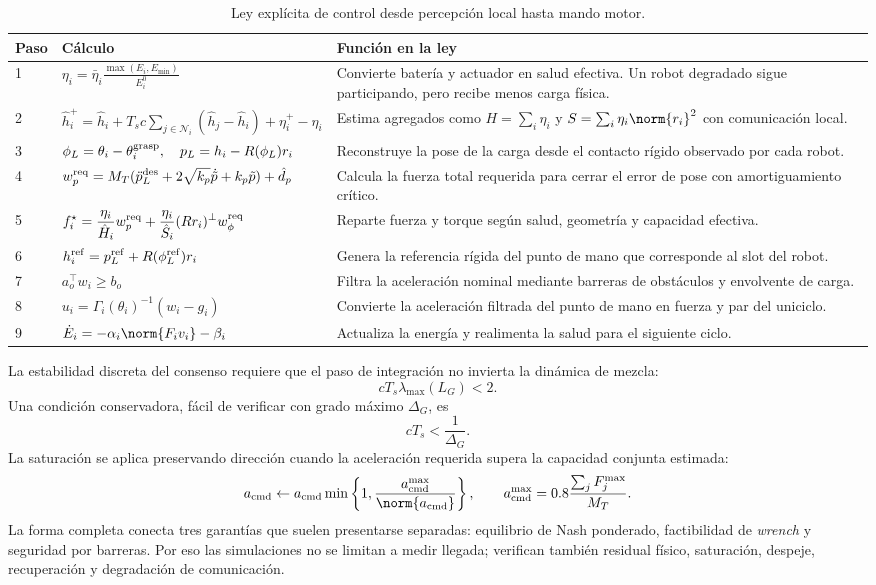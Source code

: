 \begin{table}[H]
\centering
\scriptsize
\begin{tabularx}{\textwidth}{@{}p{}p{}X@{}}
\toprule
Paso & Cálculo & Función en la ley \\
\midrule
1 & $\displaystyle \eta_i=\bar\eta_i\frac{\max(E_i,E_{\min})}{E_i^0}$ & Convierte batería y actuador en salud efectiva. Un robot degradado sigue participando, pero recibe menos carga física. \\
2 & $\displaystyle \hat h_i^+=\hat h_i+T_sc\sum_{j\in\mathcal N_i}(\hat h_j-\hat h_i)+\eta_i^+-\eta_i$ & Estima agregados como $H=\sum_i\eta_i$ y $S=\sum_i\eta_i\norm{r_i}^2$ con comunicación local. \\
3 & $\displaystyle \phi_L=\theta_i-\theta_i^{\rm grasp},\quad p_L=h_i-R(\phi_L)r_i$ & Reconstruye la pose de la carga desde el contacto rígido observado por cada robot. \\
4 & $\displaystyle w_p^{\rm req}=M_T(\ddot p_L^{\rm des}+2\sqrt{k_p}\dot{\tilde p}+k_p\tilde p)+\hat d_p$ & Calcula la fuerza total requerida para cerrar el error de pose con amortiguamiento crítico. \\
5 & $\displaystyle f_i^\star=\frac{\eta_i}{\hat H_i}w_p^{\rm req}+\frac{\eta_i}{\hat S_i}(Rr_i)^\perp w_\phi^{\rm req}$ & Reparte fuerza y torque según salud, geometría y capacidad efectiva. \\
6 & $\displaystyle h_i^{\rm ref}=p_L^{\rm ref}+R(\phi_L^{\rm ref})r_i$ & Genera la referencia rígida del punto de mano que corresponde al slot del robot. \\
7 & $\displaystyle a_o^\top w_i\ge b_o$ & Filtra la aceleración nominal mediante barreras de obstáculos y envolvente de carga. \\
8 & $\displaystyle u_i=\Gamma_i(\theta_i)^{-1}(w_i-g_i)$ & Convierte la aceleración filtrada del punto de mano en fuerza y par del uniciclo. \\
9 & $\displaystyle \dot E_i=-\alpha_i\norm{F_iv_i}-\beta_i$ & Actualiza la energía y realimenta la salud para el siguiente ciclo. \\
\bottomrule
\end{tabularx}
\caption{Ley explícita de control desde percepción local hasta mando motor.}
\label{tab:ley-explicita-sensor-motor}
\end{table}

La estabilidad discreta del consenso requiere que el paso de integración no invierta la
dinámica de mezcla:
\[
  cT_s\lambda_{\max}(L_G)<2.
\]
Una condición conservadora, fácil de verificar con grado máximo $\Delta_G$, es
\[
  cT_s<\frac{1}{\Delta_G}.
\]
La saturación se aplica preservando dirección cuando la aceleración requerida supera la
capacidad conjunta estimada:
\[
  a_{\rm cmd}\leftarrow
  a_{\rm cmd}\min\left\{1,\frac{a_{\rm cmd}^{\max}}{\norm{a_{\rm cmd}}}\right\},
  \qquad
  a_{\rm cmd}^{\max}=0.8\frac{\sum_j F_j^{\max}}{M_T}.
\]
La forma completa conecta tres garantías que suelen presentarse separadas: equilibrio de
Nash ponderado, factibilidad de \emph{wrench} y seguridad por barreras. Por eso las
simulaciones no se limitan a medir llegada; verifican también residual físico, saturación,
despeje, recuperación y degradación de comunicación.

